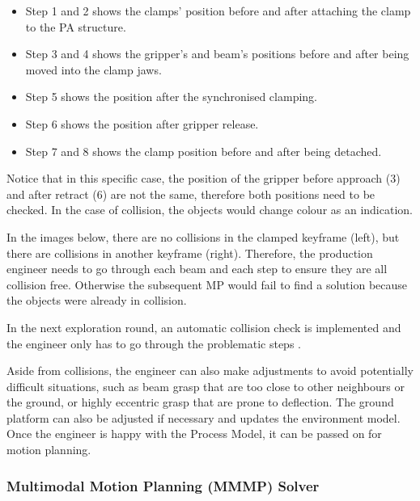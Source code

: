 \begin{itemize}
	\item Step 1 and 2 shows the clamps’ position before and after attaching the clamp to the PA structure. 

	\item Step 3 and 4 shows the gripper’s and beam’s positions before and after being moved into the clamp jaws. 

	\item Step 5 shows the position after the synchronised clamping.

	\item Step 6 shows the position after gripper release. 

	\item Step 7 and 8 shows the clamp position before and after being detached.

\end{itemize}
Notice that in this specific case, the position of the gripper before approach (3) and after retract (6) are not the same, therefore both positions need to be checked. In the case of collision, the objects would change colour as an indication.



In the images below, there are no collisions in the clamped keyframe (left), but there are collisions in another keyframe (right). Therefore, the production engineer needs to go through each beam and each step to ensure they are all collision free. Otherwise the subsequent MP would fail to find a solution because the objects were already in collision. 



In the next exploration round, an automatic collision check is implemented and the engineer only has to go through the problematic steps .

Aside from collisions, the engineer can also make adjustments to avoid potentially difficult situations, such as beam grasp that are too close to other neighbours or the ground, or highly eccentric grasp that are prone to deflection. The ground platform can also be adjusted if necessary and updates the environment model. Once the engineer is happy with the Process Model, it can be passed on for motion planning. 

\subsubsection{Multimodal Motion Planning (MMMP) Solver}
\label{subsubsection:exploration-3-multimodal-motion-planning-mmmp-solver}

